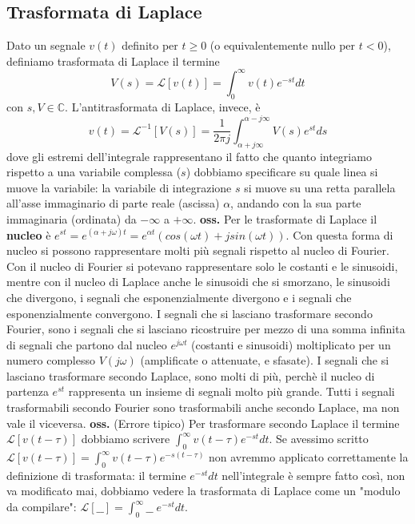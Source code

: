 \subsection{Trasformata di Laplace}
Dato un segnale $v(t)$ definito per $t\geq 0$ (o equivalentemente nullo per $t < 0$), definiamo trasformata di Laplace il termine
\[
    V(s) = \mathcal{L}[v(t)] = \int_{0}^{\infty} v(t) e^{-st}dt
\]
con $s,V \in \mathbb{C}$.\newline
L'antitrasformata di Laplace, invece, è
\[
    v(t) = \mathcal{L}^{-1}[V(s)] = \frac{1}{2\pi j} \int_{\alpha + j \infty}^{\alpha - j \infty} V(s) e^{st}ds
\]
dove gli estremi dell'integrale rappresentano il fatto che quanto integriamo rispetto a una variabile complessa ($s$) dobbiamo specificare su quale linea si muove la variabile: la variabile di integrazione $s$ si muove su una retta parallela all'asse immaginario di parte reale (ascissa) $\alpha$, andando con la sua parte immaginaria (ordinata) da $- \infty$ a $+ \infty$.\newline
\newline
\textbf{oss.} Per le trasformate di Laplace il \textbf{nucleo} è $e^{st} = e^{(\alpha + j \omega) t} = e^{\alpha t} (cos(\omega t) + j sin(\omega t))$. Con questa forma di nucleo si possono rappresentare molti più segnali rispetto al nucleo di Fourier. Con il nucleo di Fourier si potevano rappresentare solo le costanti e le sinusoidi, mentre con il nucleo di Laplace anche le sinusoidi che si smorzano, le sinusoidi che divergono, i segnali che esponenzialmente divergono e i segnali che esponenzialmente convergono.\newline
I segnali che si lasciano trasformare secondo Fourier, sono i segnali che si lasciano ricostruire per mezzo di una somma infinita di segnali che partono dal nucleo $e^{j \omega t}$ (costanti e sinusoidi) moltiplicato per un numero complesso $V(j \omega)$ (amplificate o attenuate, e sfasate).\newline
I segnali che si lasciano trasformare secondo Laplace, sono molti di più, perchè il nucleo di partenza $e^{st}$ rappresenta un insieme di segnali molto più grande. Tutti i segnali trasformabili secondo Fourier sono trasformabili anche secondo Laplace, ma non vale il viceversa.\newline
\newline
\textbf{oss.} (Errore tipico) Per trasformare secondo Laplace il termine $\mathcal{L}[v(t-\tau)]$ dobbiamo scrivere $\int_{0}^{\infty}v(t-\tau) e^{-st}dt$. Se avessimo scritto $\mathcal{L}[v(t-\tau)]= \int_{0}^{\infty}v(t-\tau) e^{-s(t-\tau)}$ non avremmo applicato correttamente la definizione di trasformata: il termine $e^{-st}dt$ nell'integrale è sempre fatto così, non va modificato mai, dobbiamo vedere la trasformata di Laplace come un "modulo da compilare": $\mathcal{L}[\_\_] = \int_{0}^{\infty}\_\_ \; e^{-st}dt$.
